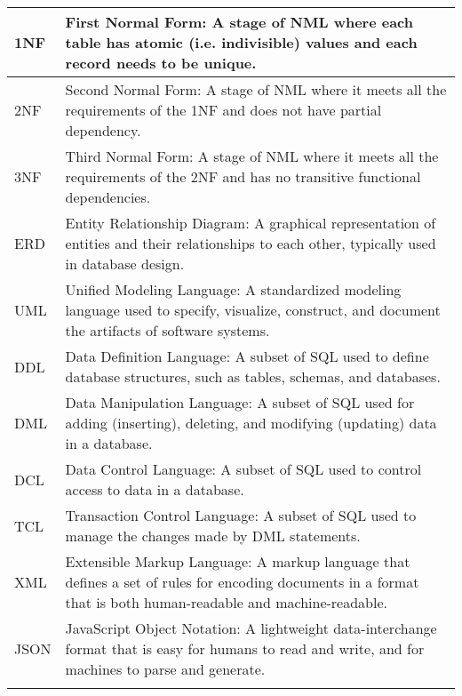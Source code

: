 \begin{longtable}{l p{13.5cm}}
        1NF          & First Normal Form: A stage of NML where each table has atomic (i.e. indivisible) values and each record needs to be unique. \\ \hline
        2NF          & Second Normal Form: A stage of NML where it meets all the requirements of the 1NF and does not have partial dependency. \\ \hline
        3NF          & Third Normal Form: A stage of NML where it meets all the requirements of the 2NF and has no transitive functional dependencies. \\ \hline
        ERD          & Entity Relationship Diagram: A graphical representation of entities and their relationships to each other, typically used in database design. \\ \hline
        UML          & Unified Modeling Language: A standardized modeling language used to specify, visualize, construct, and document the artifacts of software systems. \\ \hline
        DDL          & Data Definition Language: A subset of SQL used to define database structures, such as tables, schemas, and databases. \\ \hline
        DML          & Data Manipulation Language: A subset of SQL used for adding (inserting), deleting, and modifying (updating) data in a database. \\ \hline
        DCL          & Data Control Language: A subset of SQL used to control access to data in a database. \\ \hline
        TCL          & Transaction Control Language: A subset of SQL used to manage the changes made by DML statements. \\ \hline
        XML          & Extensible Markup Language: A markup language that defines a set of rules for encoding documents in a format that is both human-readable and machine-readable. \\ \hline
        JSON         & JavaScript Object Notation: A lightweight data-interchange format that is easy for humans to read and write, and for machines to parse and generate. \\ \hline
    \renewcommand{\arraystretch}{1}
\end{longtable}
